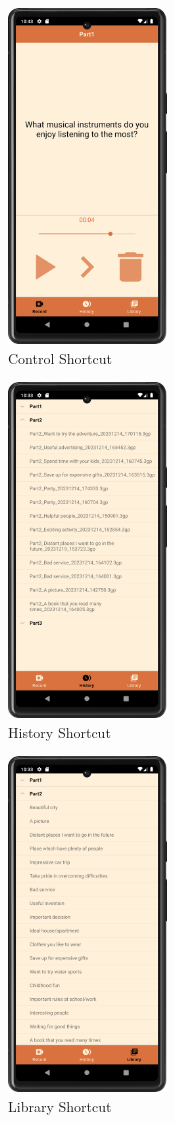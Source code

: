 \documentclass[conference,10pt,letterpaper]{IEEEtran}
\begin{document}
	\begin{figure}[htbp]
		\centerline{\includegraphics[height=3.5in]{src/control shortcut.png}}
		\caption{Control Shortcut}
		\label{fig:control_shortcut}
	\end{figure}
	
	\begin{figure}[htbp]
		\centerline{\includegraphics[height=3.5in]{src/history shortcut.png}}
		\caption{History Shortcut}
		\label{fig:history_shortcut}
	\end{figure}
	
	\begin{figure}[htbp]
		\centerline{\includegraphics[height=3.5in]{src/library shortcut.png}}
		\caption{Library Shortcut}
		\label{fig:library_shortcut}
	\end{figure}
	
\end{document}
